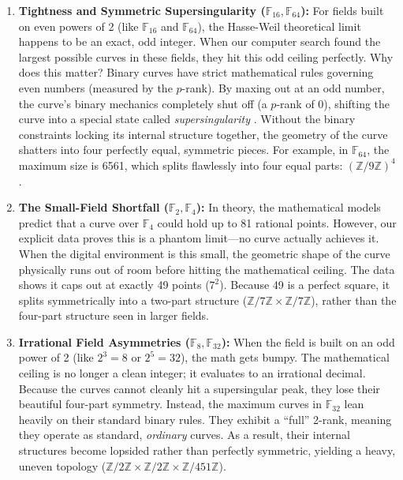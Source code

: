 \documentclass[11pt,letterpaper]{article}
\begin{document}
\begin{enumerate}
\item \textbf{Tightness and Symmetric Supersingularity ($\mathbb{F}_{16}, \mathbb{F}_{64}$):} 
For fields built on even powers of 2 (like $\mathbb{F}_{16}$ and $\mathbb{F}_{64}$), the Hasse-Weil theoretical limit happens to be an exact, odd integer. When our computer search found the largest possible curves in these fields, they hit this odd ceiling perfectly. Why does this matter? Binary curves have strict mathematical rules governing even numbers (measured by the $p$-rank). By maxing out at an odd number, the curve's binary mechanics completely shut off (a $p$-rank of 0), shifting the curve into a special state called \textit{supersingularity} \cite{Scholten2002}. Without the binary constraints locking its internal structure together, the geometry of the curve shatters into four perfectly equal, symmetric pieces. For example, in $\mathbb{F}_{64}$, the maximum size is 6561, which splits flawlessly into four equal parts: $(\mathbb{Z}/9\mathbb{Z})^4$.

\item \textbf{The Small-Field Shortfall ($\mathbb{F}_2, \mathbb{F}_4$):} 
In theory, the mathematical models predict that a curve over $\mathbb{F}_4$ could hold up to 81 rational points. However, our explicit data proves this is a phantom limit---no curve actually achieves it. When the digital environment is this small, the geometric shape of the curve physically runs out of room before hitting the mathematical ceiling. The data shows it caps out at exactly 49 points ($7^2$). Because 49 is a perfect square, it splits symmetrically into a two-part structure ($\mathbb{Z}/7\mathbb{Z} \times \mathbb{Z}/7\mathbb{Z}$), rather than the four-part structure seen in larger fields.

\item \textbf{Irrational Field Asymmetries ($\mathbb{F}_8, \mathbb{F}_{32}$):} 
When the field is built on an odd power of 2 (like $2^3=8$ or $2^5=32$), the math gets bumpy. The mathematical ceiling is no longer a clean integer; it evaluates to an irrational decimal. Because the curves cannot cleanly hit a supersingular peak, they lose their beautiful four-part symmetry. Instead, the maximum curves in $\mathbb{F}_{32}$ lean heavily on their standard binary rules. They exhibit a ``full'' 2-rank, meaning they operate as standard, \textit{ordinary} curves. As a result, their internal structures become lopsided rather than perfectly symmetric, yielding a heavy, uneven topology ($\mathbb{Z}/2\mathbb{Z} \times \mathbb{Z}/2\mathbb{Z} \times \mathbb{Z}/451\mathbb{Z}$).
\end{enumerate}
\end{document}
